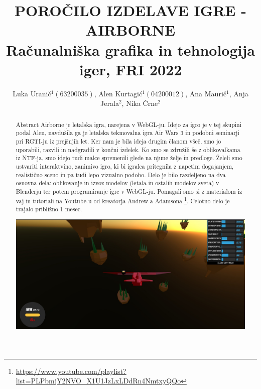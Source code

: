 \documentclass[a4paper]{article}
\begin{document}
\title{POROČILO IZDELAVE IGRE - AIRBORNE \\
 Računalniška grafika in tehnologija iger, FRI 2022}

\author{Luka Uranič$^{1} (63200035)$, Alen Kurtagić$^{1} (04200012)$,  Ana Maurič$^{1}$,  Anja Jerala$^{2}$,  Nika Črne$^{2}$} %



\maketitle


\begin{abstract}{Abstract}%
Airborne je letalska igra, narejena v WebGL-ju. Idejo za igro je v tej skupini podal Alen, navdušila ga je letalska tekmovalna igra Air Wars 3 in podobni seminarji pri RGTI-ju iz prejšnjih let. Ker nam je bila ideja drugim članom všeč, smo jo uporabili, razvili in nadgradili v končni izdelek. Ko smo se združili še z oblikovalkama iz NTF-ja, smo idejo tudi malce spremenili glede na njune želje in predloge. Želeli smo ustvariti interaktvino, zanimivo igro, ki bi igralca pritegnila z napetim dogajanjem, realistično sceno in pa tudi lepo vizualno podobo. Delo je bilo razdeljeno na dva osnovna dela: oblikovanje in izvoz modelov (letala in ostalih modelov sveta) v Blenderju ter potem programiranje igre v WebGL-ju. Pomagali smo si z materialom iz vaj in tutoriali na Youtube-u od kreatorja Andrew-a Adamsona \footnote{\url{https://www.youtube.com/playlist?list=PLPbmjY2NVO_X1U1JzLxLDdRn4NmtxyQQo}}. Celotno delo je trajalo približno 1 mesec. 
\begin{center}
     \includegraphics[width=\columnwidth]{igra.jpg}
\end{center}
\end{abstract}
\end{document}
